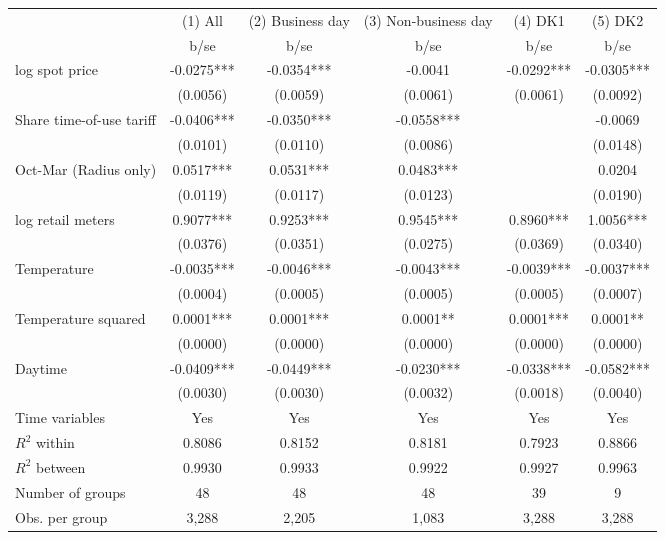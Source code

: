 \begin{tabular}{lccccc}\toprule
                    &     (1) All   &(2) Business day   &(3) Non-business day   &     (4) DK1   &     (5) DK2   \\
                    &        b/se   &        b/se   &        b/se   &        b/se   &        b/se   \\
\midrule
log spot price      &     -0.0275***&     -0.0354***&     -0.0041   &     -0.0292***&     -0.0305***\\
                    &    (0.0056)   &    (0.0059)   &    (0.0061)   &    (0.0061)   &    (0.0092)   \\
Share time-of-use tariff&     -0.0406***&     -0.0350***&     -0.0558***&               &     -0.0069   \\
                    &    (0.0101)   &    (0.0110)   &    (0.0086)   &               &    (0.0148)   \\
Oct-Mar (Radius only)&      0.0517***&      0.0531***&      0.0483***&               &      0.0204   \\
                    &    (0.0119)   &    (0.0117)   &    (0.0123)   &               &    (0.0190)   \\
log retail meters   &      0.9077***&      0.9253***&      0.9545***&      0.8960***&      1.0056***\\
                    &    (0.0376)   &    (0.0351)   &    (0.0275)   &    (0.0369)   &    (0.0340)   \\
Temperature         &     -0.0035***&     -0.0046***&     -0.0043***&     -0.0039***&     -0.0037***\\
                    &    (0.0004)   &    (0.0005)   &    (0.0005)   &    (0.0005)   &    (0.0007)   \\
Temperature squared &      0.0001***&      0.0001***&      0.0001** &      0.0001***&      0.0001** \\
                    &    (0.0000)   &    (0.0000)   &    (0.0000)   &    (0.0000)   &    (0.0000)   \\
Daytime             &     -0.0409***&     -0.0449***&     -0.0230***&     -0.0338***&     -0.0582***\\
                    &    (0.0030)   &    (0.0030)   &    (0.0032)   &    (0.0018)   &    (0.0040)   \\
Time variables      &         Yes   &         Yes   &         Yes   &         Yes   &         Yes   \\
\midrule
\(R^2\) within      &      0.8086   &      0.8152   &      0.8181   &      0.7923   &      0.8866   \\
\(R^2\) between     &      0.9930   &      0.9933   &      0.9922   &      0.9927   &      0.9963   \\
Number of groups    &          48   &          48   &          48   &          39   &           9   \\
Obs. per group      &       3,288   &       2,205   &       1,083   &       3,288   &       3,288   \\
\bottomrule\end{tabular}
